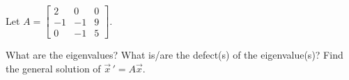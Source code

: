 \documentclass{ximera}
\begin{document}
\begin{exercise}%
    Let $A = \left[ 
        \begin{smallmatrix}
            2 & 0 & 0 \\
            -1 & -1 & 9 \\
            0 & -1 & 5
        \end{smallmatrix}
    \right]$.  
    \begin{tasks}
        \task What are the eigenvalues?
        \task What is/are the defect(s) of the eigenvalue(s)?
        \task Find the general solution of $\vec{x}\,' = A\vec{x}$.
    \end{tasks}
\end{exercise}
\end{document}
